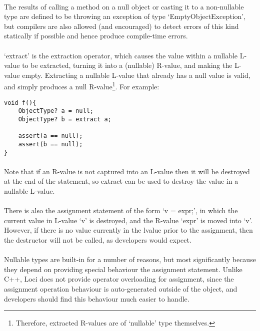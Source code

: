 \documentclass[12pt,twoside,notitlepage]{report}
\begin{document}
\paragraph{}
The results of calling a method on a null object or casting it to a non-nullable type are defined to be throwing an exception of type `EmptyObjectException', but compilers are also allowed (and encouraged) to detect errors of this kind statically if possible and hence produce compile-time errors.

\paragraph{}
`extract' is the extraction operator, which causes the value within a nullable L-value to be extracted, turning it into a (nullable) R-value, and making the L-value empty. Extracting a nullable L-value that already has a null value is valid, and simply produces a null R-value\footnote{Therefore, extracted R-values are of `nullable' type themselves.}. For example:

\begin{lstlisting}
void f(){
	ObjectType? a = null;
	ObjectType? b = extract a;
	
	assert(a == null);
	assert(b == null);
}
\end{lstlisting}

\paragraph{}
Note that if an R-value is not captured into an L-value then it will be destroyed at the end of the statement, so extract can be used to destroy the value in a nullable L-value.

\paragraph{}
There is also the assignment statement of the form `v = expr;', in which the current value in L-value `v' is destroyed, and the R-value `expr' is moved into `v'. However, if there is no value currently in the lvalue prior to the assignment, then the destructor will not be called, as developers would expect.

\paragraph{}
Nullable types are built-in for a number of reasons, but most significantly because they depend on providing special behaviour the assignment statement. Unlike C++, Loci does not provide operator overloading for assignment, since the assignment operation behaviour is auto-generated outside of the object, and developers should find this behaviour much easier to handle.
\end{document}
